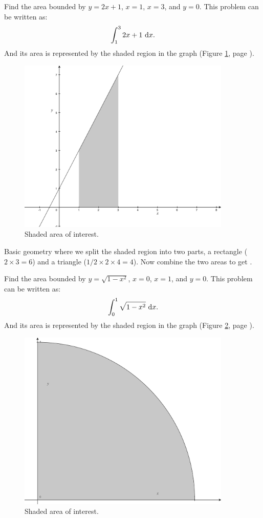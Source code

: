 \documentclass[12pt,addpoints, answers, fleqn]{exam}
\begin{document}
\begin{questions}

\question Find the area bounded by $y = 2x + 1$, $x=1$, $x=3$, and $y=0$. This problem can be written as:
\[
\int_1^3 2x + 1 \ {\rm{d}}x.
\]
And its area is represented by the shaded region in the graph (Figure \ref{fig:area01}, page \pageref{fig:area01}).
\begin{figure}[htbp] %
   \centering
   \includegraphics[width=4in]{./graphics/graph2701.pdf} 
   \caption{Shaded area of interest.}
   \label{fig:area01}
\end{figure}

\begin{solution}
Basic geometry where we split the shaded region into two parts, a rectangle ($2 \times 3 = 6$) and a triangle ($1/2 \times 2 \times 4= 4$). Now combine the two areas to get .
\end{solution}

\question Find the area bounded by $y = \sqrt{1-x^2}$, $x=0$, $x=1$, and $y=0$. This problem can be written as:
\[
\int_0^1 \sqrt{1-x^2} \ {\rm{d}}x.
\]
And its area is represented by the shaded region in the graph  (Figure \ref{fig:area02}, page \pageref{fig:area02}).

\begin{figure}[htbp] %
   \centering
   \includegraphics[width=4in]{./graphics/graph2702.pdf} 
   \caption{Shaded area of interest.}
   \label{fig:area02}
\end{figure}




\end{questions}
\end{document}
